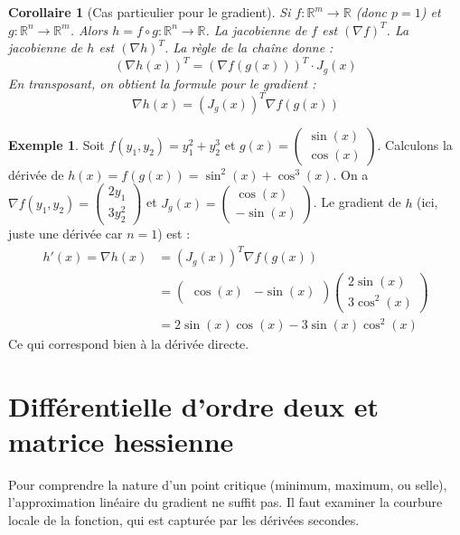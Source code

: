 \documentclass[a4paper,12pt,openany]{book}
\theoremstyle{plain}
\newtheorem{corollary}[theorem]{Corollaire}
\theoremstyle{definition}
\newtheorem{example}[theorem]{Exemple}
\theoremstyle{remark}
\theoremstyle{nbstyle}
\newcommand{\R}{\mathbb{R}}
\newcommand{\grad}{\nabla}
\newcommand{\T}{^T}
\begin{document}
	\begin{corollary}[Cas particulier pour le gradient]
		Si $f: \R^m \to \R$ (donc $p=1$) et $g: \R^n \to \R^m$. Alors $h = f \circ g : \R^n \to \R$.
		La jacobienne de $f$ est $(\grad f)\T$. La jacobienne de $h$ est $(\grad h)\T$.
		La règle de la chaîne donne :
		$$ (\grad h(x))\T = (\grad f(g(x)))\T \cdot J_g(x) $$
		En transposant, on obtient la formule pour le gradient :
		$$ \grad h(x) = (J_g(x))\T \grad f(g(x)) $$
	\end{corollary}
	
	\begin{example}
		Soit $f(y_1, y_2) = y_1^2 + y_2^3$ et $g(x) = \begin{pmatrix} \sin(x) \\ \cos(x) \end{pmatrix}$. Calculons la dérivée de $h(x) = f(g(x)) = \sin^2(x) + \cos^3(x)$.
		On a $\grad f(y_1, y_2) = \begin{pmatrix} 2y_1 \\ 3y_2^2 \end{pmatrix}$ et $J_g(x) = \begin{pmatrix} \cos(x) \\ -\sin(x) \end{pmatrix}$.
		Le gradient de $h$ (ici, juste une dérivée car $n=1$) est :
		\begin{align*}
		h'(x) = \grad h(x) &= (J_g(x))\T \grad f(g(x)) \\
		&= \begin{pmatrix} \cos(x) & -\sin(x) \end{pmatrix} \begin{pmatrix} 2\sin(x) \\ 3\cos^2(x) \end{pmatrix} \\
		&= 2\sin(x)\cos(x) - 3\sin(x)\cos^2(x)
		\end{align*}
		Ce qui correspond bien à la dérivée directe.
	\end{example}
	
	
	\section{Différentielle d'ordre deux et matrice hessienne}
	
	Pour comprendre la nature d'un point critique (minimum, maximum, ou selle), l'approximation linéaire du gradient ne suffit pas. Il faut examiner la courbure locale de la fonction, qui est capturée par les dérivées secondes.
	
\end{document}
